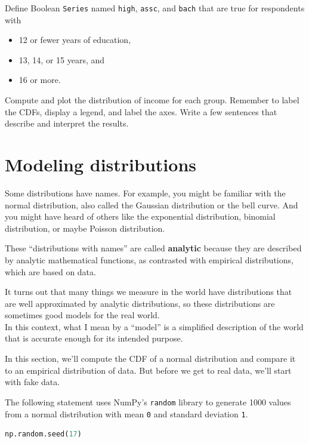 Define Boolean \passthrough{\lstinline!Series!} named
\passthrough{\lstinline!high!}, \passthrough{\lstinline!assc!}, and
\passthrough{\lstinline!bach!} that are true for respondents with

\begin{itemize}
\item
  12 or fewer years of education,
\item
  13, 14, or 15 years, and
\item
  16 or more.
\end{itemize}

Compute and plot the distribution of income for each group. Remember to
label the CDFs, display a legend, and label the axes. Write a few
sentences that describe and interpret the results.

\hypertarget{modeling-distributions}{%
\section{Modeling distributions}\label{modeling-distributions}}

Some distributions have names. For example, you might be familiar with
the normal distribution, also called the Gaussian distribution or the
bell curve. And you might have heard of others like the exponential
distribution, binomial distribution, or maybe Poisson distribution.

These ``distributions with names'' are called \textbf{analytic} because
they are described by analytic mathematical functions, as contrasted
with empirical distributions, which are based on data.

It turns out that many things we measure in the world have distributions
that are well approximated by analytic distributions, so these
distributions are sometimes good models for the real world.\\
In this context, what I mean by a ``model'' is a simplified description
of the world that is accurate enough for its intended purpose.

In this section, we'll compute the CDF of a normal distribution and
compare it to an empirical distribution of data. But before we get to
real data, we'll start with fake data.

The following statement uses NumPy's \passthrough{\lstinline!random!}
library to generate 1000 values from a normal distribution with mean
\passthrough{\lstinline!0!} and standard deviation
\passthrough{\lstinline!1!}.

\begin{lstlisting}[language=Python,style=source]
np.random.seed(17)
\end{lstlisting}

